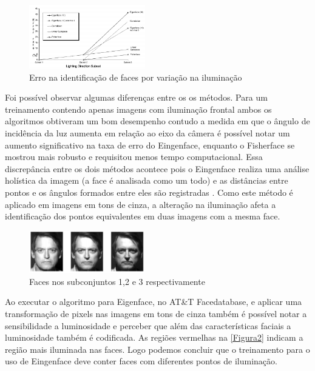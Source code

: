 \begin{figure}[H]
    \includegraphics[width=0.45\textwidth]{conteudo/Grafico1}
    \caption{Erro na identificação de faces por variação na iluminação}
    \label{Grafico1}
\end{figure}

	Foi possível observar algumas diferenças entre os os métodos. Para um treinamento contendo apenas imagens com iluminação frontal ambos os algoritmos obtiveram um bom desempenho contudo a medida em que o ângulo de incidência da luz aumenta em relação ao eixo da câmera é possível notar um aumento significativo na taxa de erro do Eingenface, enquanto o Fisherface se mostrou mais robusto e requisitou menos tempo computacional.
	Essa discrepância entre os dois métodos acontece pois o Eingenface realiza uma análise holística da imagem (a face é analisada como um todo) e as distâncias entre pontos e os ângulos formados entre eles são registradas \cite{foggia2009image}. Como este método é aplicado em imagens em tons de cinza, a alteração na iluminação afeta a identificação dos pontos equivalentes em duas imagens com a mesma face.
		
\begin{figure}[H]
    \includegraphics[width=0.45\textwidth]{conteudo/Figura1}
    \caption{Faces nos subconjuntos 1,2 e 3 respectivamente}
    \label{Figura1}
\end{figure}
	
	Ao executar o algoritmo para Eigenface, no AT\&T Facedatabase, e aplicar uma transformação de pixels nas imagens em tons de cinza também é possível notar a sensibilidade a luminosidade e perceber que além das características faciais a luminosidade também é codificada. As regiões vermelhas na \autoref{Figura2} indicam a região mais iluminada nas faces. Logo podemos concluir que o treinamento para o uso de Eingenface deve conter faces com diferentes pontos de iluminação.


